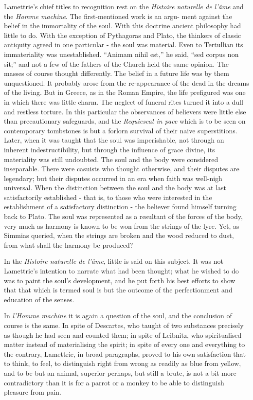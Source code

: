 \documentclass[]{book}
\begin{document}
Lamettrie's chief titles to recognition rest on the \emph{Histoire
naturelle de l'âme} and the \emph{Homme machine}. The first-mentioned
work is an argu- ment against the belief in the immortality of the soul.
With this doctrine ancient philosophy had little to do. With the
exception of Pythagoras and Plato, the thinkers of classic antiquity
agreed in one particular - the soul was material. Even to Tertullian its
immateriality was unestablished. ``Animam nihil est,'' he said, ``sed
corpus non sit;'' and not a few of the fathers of the Church held the
same opinion. The masses of course thought differently. The belief in a
future life was by them unquestioned. It probably arose from the
re-appearance of the dead in the dreams of the living. But in Greece, as
in the Roman Empire, the life prefigured was one in which there was
little charm. The neglect of funeral rites turned it into a dull and
restless torture. In this particular the observances of believers were
little else than precautionary safeguards, and the \emph{Requiescat in
pace} which is to be seen on contemporary tombstones is but a forlorn
survival of their naive superstitions. Later, when it was taught that
the soul was imperishable, not through an inherent indestructibility,
but through the influence of grace divine, its materiality was still
undoubted. The soul and the body were considered inseparable. There were
casuists who thought otherwise, and their disputes are legendary; but
their disputes occurred in an era when faith was well-nigh universal.
When the distinction between the soul and the body was at last
satisfactorily established - that is, to those who were interested in
the establishment of a satisfactory distinction - the believer found
himself turning back to Plato. The soul was represented as a resultant
of the forces of the body, very much as harmony is known to be won from
the strings of the lyre. Yet, as Simmias queried, when the strings are
broken and the wood reduced to dust, from what shall the harmony be
produced?

In the \emph{Histoire naturelle de l'âme}, little is said on this
subject. It was not Lamettrie's intention to narrate what had been
thought; what he wished to do was to paint the soul's development, and
he put forth his best efforts to show that that which is termed soul is
but the outcome of the perfectionment and education of the senses.

In \emph{l'Homme machine} it is again a question of the soul, and the
conclusion of course is the same. In spite of Descartes, who taught of
two substances precisely as though he had seen and counted them; in
spite of Leibnitz, who spiritualised matter instead of materialising the
spirit; in spite of every one and everything to the contrary, Lamettrie,
in broad paragraphs, proved to his own satisfaction that to think, to
feel, to distinguish right from wrong as readily as blue from yellow,
and to be but an animal, superior perhaps, but still a brute, is not a
bit more contradictory than it is for a parrot or a monkey to be able to
distinguish pleasure from pain.
\end{document}
